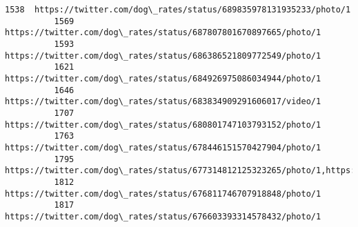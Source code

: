 \documentclass[11pt]{article}
\begin{document}
\begin{Verbatim}[commandchars=\\\{\}]
          1538  https://twitter.com/dog\_rates/status/689835978131935233/photo/1                                                                                                                                                                                                   
          1569  https://twitter.com/dog\_rates/status/687807801670897665/photo/1                                                                                                                                                                                                   
          1593  https://twitter.com/dog\_rates/status/686386521809772549/photo/1                                                                                                                                                                                                   
          1621  https://twitter.com/dog\_rates/status/684926975086034944/photo/1                                                                                                                                                                                                   
          1646  https://twitter.com/dog\_rates/status/683834909291606017/video/1                                                                                                                                                                                                   
          1707  https://twitter.com/dog\_rates/status/680801747103793152/photo/1                                                                                                                                                                                                   
          1763  https://twitter.com/dog\_rates/status/678446151570427904/photo/1                                                                                                                                                                                                   
          1795  https://twitter.com/dog\_rates/status/677314812125323265/photo/1,https://twitter.com/dog\_rates/status/677314812125323265/photo/1                                                                                                                                   
          1812  https://twitter.com/dog\_rates/status/676811746707918848/photo/1                                                                                                                                                                                                   
          1817  https://twitter.com/dog\_rates/status/676603393314578432/photo/1                                                                                                                                                                                                   

\end{Verbatim}
\end{document}
